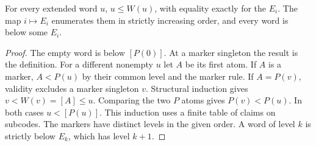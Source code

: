 \begin{theorem}
For every extended word $u$, $u\le W(u)$, with equality exactly for the $E_i$. The map $i\mapsto E_i$ enumerates them in strictly increasing order, and every word is below some $E_i$.
\end{theorem}
\begin{proof}
The empty word is below $[P(0)]$. At a marker singleton the result is the definition. For a different nonempty $u$ let $A$ be its first atom. If $A$ is a marker, $A<P(u)$ by their common level and the marker rule. If $A=P(v)$, validity excludes a marker singleton $v$. Structural induction gives $v<W(v)=[A]\le u$. Comparing the two $P$ atoms gives $P(v)<P(u)$. In both cases $u<[P(u)]$. This induction uses a finite table of claims on subcodes. The markers have distinct levels in the given order. A word of level $k$ is strictly below $E_k$, which has level $k+1$.
\end{proof}

